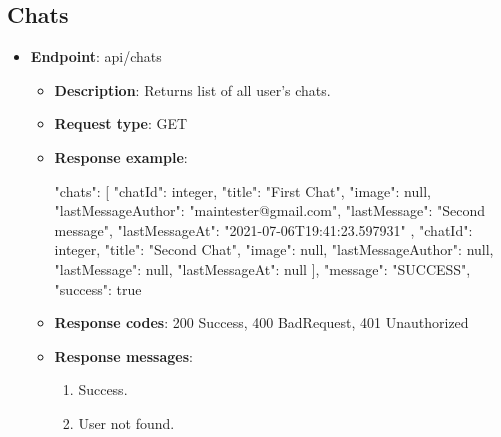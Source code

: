 \subsection{Chats}\label{subsec:chats}
\begin{itemize}
    \item \textbf{Endpoint}: api/chats
    \begin{itemize}
        \item \textbf{Description}: Returns list of all user's chats.
        \item \textbf{Request type}: GET
        \item \textbf{Response example}:
        \begin{spverbatim}
        {
            "chats": [
                {
                    "chatId": integer,
                    "title": "First Chat",
                    "image": null,
                    "lastMessageAuthor": "maintester@gmail.com",
                    "lastMessage": "Second message",
                    "lastMessageAt": "2021-07-06T19:41:23.597931"
                },
                {
                    "chatId": integer,
                    "title": "Second Chat",
                    "image": null,
                    "lastMessageAuthor": null,
                    "lastMessage": null,
                    "lastMessageAt": null
                }
            ],
            "message": "SUCCESS",
            "success": true
        }
        \end{spverbatim}
        \item \textbf{Response codes}: 200 Success, 400 BadRequest, 401 Unauthorized
        \item \textbf{Response messages}:
        \begin{enumerate}
            \item Success.
            \item User not found.
        \end{enumerate}
    \end{itemize}


\end{itemize}
